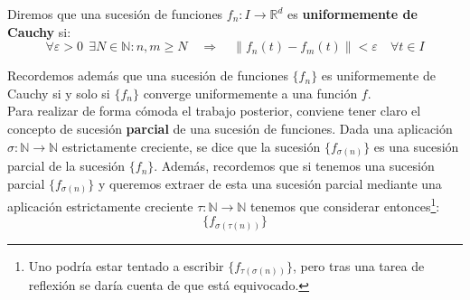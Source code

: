 \noindent
Diremos que una sucesión de funciones $f_n:I\to \mathbb{R}^d$ es \textbf{uniformemente de Cauchy} si:
\begin{equation*}
    \forall \varepsilon>0~~\exists N\in \mathbb{N} : n,m\geq N \quad \Longrightarrow \quad \|f_n(t) - f_m(t)\| < \varepsilon \quad \forall t\in I
\end{equation*}

\noindent
Recordemos además que una sucesión de funciones $\{f_n\}$ es uniformemente de Cauchy si y solo si $\{f_n\}$ converge uniformemente a una función $f$.\\

\noindent
Para realizar de forma cómoda el trabajo posterior, conviene tener claro el concepto de sucesión \textbf{parcial} de una sucesión de funciones. Dada una aplicación $\sigma:\mathbb{N}\to \mathbb{N}$ estrictamente creciente, se dice que la sucesión $\{f_{\sigma(n)}\}$ es una sucesión parcial de la sucesión $\{f_n\}$. Además, recordemos que si tenemos una sucesión parcial $\{f_{\sigma(n)}\}$ y queremos extraer de esta una sucesión parcial mediante una aplicación estrictamente creciente $\tau:\mathbb{N}\to \mathbb{N}$ tenemos que considerar entonces\footnote{Uno podría estar tentado a escribir $\{f_{\tau(\sigma(n))}\}$, pero tras una tarea de reflexión se daría cuenta de que está equivocado.}:
\begin{equation*}
    \{f_{\sigma(\tau(n))}\}
\end{equation*}


